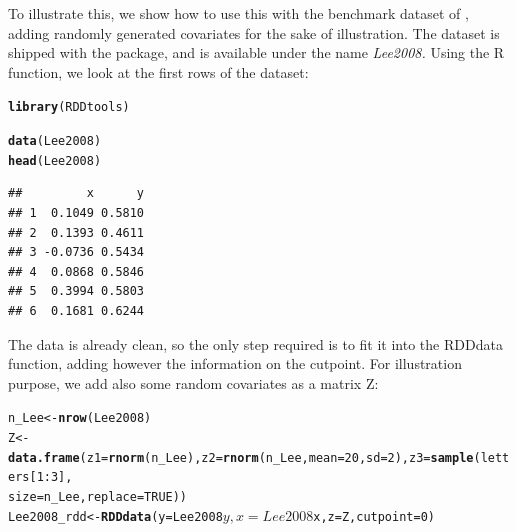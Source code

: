 \documentclass[english,nojss]{jss}\usepackage{graphicx, color}
\makeatletter
\newcommand{\hlfunctioncall}[1]{\textcolor[rgb]{0.501960784313725,0,0.329411764705882}{\textbf{#1}}}%
\newenvironment{kframe}{%
 \def\at@end@of@kframe{}%
 \ifinner\ifhmode%
  \def\at@end@of@kframe{\end{minipage}}%
  \begin{minipage}{\columnwidth}%
 \fi\fi%
 \def\FrameCommand##1{\hskip\@totalleftmargin \hskip-\fboxsep
 \colorbox{shadecolor}{##1}\hskip-\fboxsep
     \hskip-\linewidth \hskip-\@totalleftmargin \hskip\columnwidth}%
 \MakeFramed {\advance\hsize-\width
   \@totalleftmargin\z@ \linewidth\hsize
   \@setminipage}}%
 {\par\unskip\endMakeFramed%
 \at@end@of@kframe}
\newenvironment{knitrout}{}{} %
\makeatother
\begin{document}
To illustrate this, we show how to use this with the benchmark dataset
of \citet{Lee2008}, adding randomly generated covariates for the
sake of illustration. The dataset is shipped with the package, and
is available under the name \emph{Lee2008. }Using the R 
function, we look at the first rows of the dataset:

\begin{knitrout}
\color{fgcolor}\begin{kframe}
\begin{alltt}
\hlfunctioncall{library}(RDDtools)
\end{alltt}


{\ttfamily\noindent\itshape\color{messagecolor}{\#\# KernSmooth 2.23 loaded\\\#\# Copyright M. P. Wand 1997-2009}}

{\ttfamily\noindent\itshape\color{messagecolor}{\#\# \\\#\# RDDtools 0.1 (rev Wednesday 2013-04-24). PLEASE NOTE THIS is currently only a development version. \\\#\# Run vignette('RDDtools') for the documentation}}\begin{alltt}
\hlfunctioncall{data}(Lee2008)
\hlfunctioncall{head}(Lee2008)
\end{alltt}
\begin{verbatim}
##         x      y
## 1  0.1049 0.5810
## 2  0.1393 0.4611
## 3 -0.0736 0.5434
## 4  0.0868 0.5846
## 5  0.3994 0.5803
## 6  0.1681 0.6244
\end{verbatim}
\end{kframe}
\end{knitrout}


The data is already clean, so the only step required is to fit it
into the RDDdata function, adding however the information on the cutpoint.
For illustration purpose, we add also some random covariates as a
matrix Z:

\begin{knitrout}
\color{fgcolor}\begin{kframe}
\begin{alltt}
n_Lee <- \hlfunctioncall{nrow}(Lee2008)
Z <- \hlfunctioncall{data.frame}(z1 = \hlfunctioncall{rnorm}(n_Lee), z2 = \hlfunctioncall{rnorm}(n_Lee, mean = 20, sd = 2), z3 = \hlfunctioncall{sample}(letters[1:3], 
    size = n_Lee, replace = TRUE))
Lee2008_rdd <- \hlfunctioncall{RDDdata}(y = Lee2008$y, x = Lee2008$x, z = Z, cutpoint = 0)
\end{alltt}
\end{kframe}
\end{knitrout}
\end{document}
